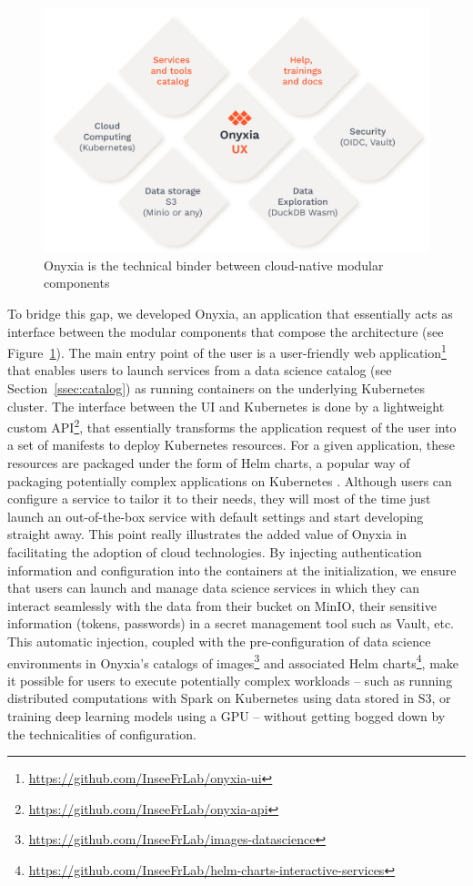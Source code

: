 \documentclass[graybox]{svmult}
\begin{document}
\begin{figure}[htbp]
    \centering
    \includegraphics[width=\linewidth]{figures/onyxia-components.png}
    \caption{Onyxia is the technical binder between cloud-native modular components}
    \label{fig:onyxia-components}
\end{figure}

To bridge this gap, we developed Onyxia, an application that essentially acts as interface between the modular components that compose the architecture (see Figure~\ref{fig:onyxia-components}). The main entry point of the user is a user-friendly web application\footnote{\url{https://github.com/InseeFrLab/onyxia-ui}} that enables users to launch services from a data science catalog (see Section~\ref{ssec:catalog}) as running containers on the underlying Kubernetes cluster. The interface between the UI and Kubernetes is done by a lightweight custom API\footnote{\url{https://github.com/InseeFrLab/onyxia-api}}, that essentially transforms the application request of the user into a set of manifests to deploy Kubernetes resources. For a given application, these resources are packaged under the form of Helm charts, a popular way of packaging potentially complex applications on Kubernetes \citep{gokhale2021creating}. Although users can configure a service to tailor it to their needs, they will most of the time just launch an out-of-the-box service with default settings and start developing straight away. This point really illustrates the added value of Onyxia in facilitating the adoption of cloud technologies. By injecting authentication information and configuration into the containers at the initialization, we ensure that users can launch and manage data science services in which they can interact seamlessly with the data from their bucket on MinIO, their sensitive information (tokens, passwords) in a secret management tool such as Vault, etc. This automatic injection, coupled with the pre-configuration of data science environments in Onyxia's catalogs of images\footnote{\url{https://github.com/InseeFrLab/images-datascience}} and associated Helm charts\footnote{\url{https://github.com/InseeFrLab/helm-charts-interactive-services}}, make it possible for users to execute potentially complex workloads -- such as running distributed computations with Spark on Kubernetes using data stored in S3, or training deep learning models using a GPU -- without getting bogged down by the technicalities of configuration.
\end{document}
